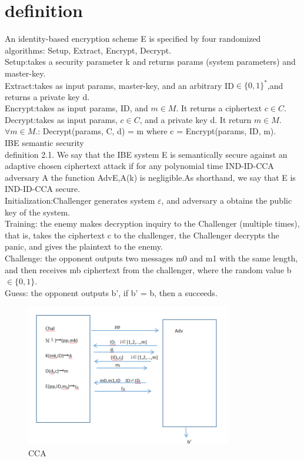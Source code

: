 \documentclass[runningheads,a4paper]{llncs}
\begin{document}
\section{definition}
An identity-based encryption scheme E is specified by four randomized algorithms: Setup, Extract, Encrypt, Decrypt.\\
Setup:takes a security parameter k and returns params (system parameters) and master-key. \\
Extract:takes as input params, master-key, and an arbitrary ID$\in \{ 0,1 \}^*$,and returns a private key d.\\
Encrypt:takes as input params, ID, and $ m\in M$. It returns a ciphertext $c \in C$.
Decrypt:takes as input params, $c \in C$, and a private key d. It return $m \in M$.
$\forall m \in M$.: Decrypt(params, C, d) = m where c = Encrypt(params, ID, m).\\
IBE semantic security\\
definition 2.1. We say that the IBE system E is semantically secure against an adaptive chosen ciphertext attack if for any polynomial time IND-ID-CCA adversary A the function AdvE,A(k) is negligible.As shorthand, we say that E is IND-ID-CCA secure.\\
Initialization:Challenger generates system $\varepsilon$, and adversary a obtains the public key of the system.\\
Training: the enemy makes decryption inquiry to the Challenger (multiple times), that is, takes the ciphertext c to the challenger, the Challenger decrypts the panic, and gives the plaintext to the enemy. \\
Challenge: the opponent outputs two messages m0 and m1 with the same length, and then receives mb ciphertext from the challenger, where the random value b$\in \{ 0,1 \}$.\\
Guess: the opponent outputs b’, if b’ = b, then a succeeds.
\begin{figure}[H]
		\centering %
		\includegraphics[width=0.8\textwidth]{./figure/CCA} %
		\caption{CCA} %
		\label{e} %

\end{figure}
\end{document}
